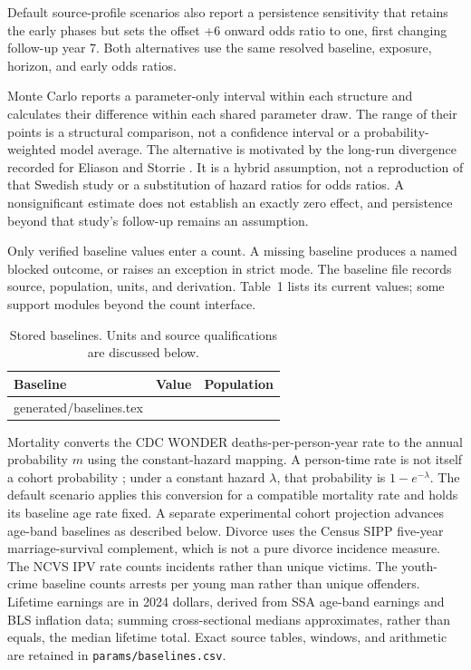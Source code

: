 \documentclass[10pt]{article}
\makeatletter
\newcommand{\tableinput}[1]{\@@input #1 }
\makeatother
\begin{document}
Default source-profile scenarios also report a persistence sensitivity
that retains the early phases but sets the offset +6 onward odds ratio to
one, first changing follow-up year 7. Both alternatives use the same
resolved baseline, exposure, horizon, and early odds ratios.

Monte Carlo reports a parameter-only interval within each structure and
calculates their difference within each shared parameter draw. The range
of their points is a structural comparison, not a confidence interval or
a probability-weighted model average. The alternative is motivated by
the long-run divergence recorded for Eliason and Storrie
\cite{eliasonstorrie2009}. It is a hybrid assumption, not a reproduction
of that Swedish study or a substitution of hazard ratios for odds ratios.
A nonsignificant estimate does not establish an exactly zero effect, and
persistence beyond that study's follow-up remains an assumption.

Only verified baseline values enter a count. A missing baseline produces
a named blocked outcome, or raises an exception in strict mode. The
baseline file records source, population, units, and derivation. Table~1
lists its current values; some support modules beyond the count interface.

\begin{table}[htbp]
\centering\small
\caption{Stored baselines. Units and source qualifications are discussed below.}
\begin{tabular}{>{\raggedright\arraybackslash}p{2.3in}r>{\raggedright\arraybackslash}p{2.0in}}
\toprule Baseline & Value & Population \\ \midrule
\tableinput{generated/baselines.tex}
\bottomrule
\end{tabular}
\end{table}

Mortality converts the CDC WONDER deaths-per-person-year rate to
the annual probability $m$ using the constant-hazard mapping. A person-time rate is not itself a cohort
probability \cite{cdcRiskMeasures}; under a constant hazard $\lambda$,
that probability is $1-e^{-\lambda}$. The default scenario applies this
conversion for a compatible mortality rate and holds its baseline age
rate fixed. A separate experimental cohort projection advances age-band
baselines as described below.
Divorce uses the Census
SIPP five-year marriage-survival complement, which is not a pure divorce
incidence measure. The NCVS IPV rate counts incidents rather than unique
victims. The youth-crime baseline counts arrests per young man rather
than unique offenders. Lifetime earnings are in 2024 dollars, derived
from SSA age-band earnings and BLS inflation data; summing cross-sectional
medians approximates, rather than equals, the median lifetime total.
Exact source tables, windows, and arithmetic are retained in
\nolinkurl{params/baselines.csv}.
\end{document}
